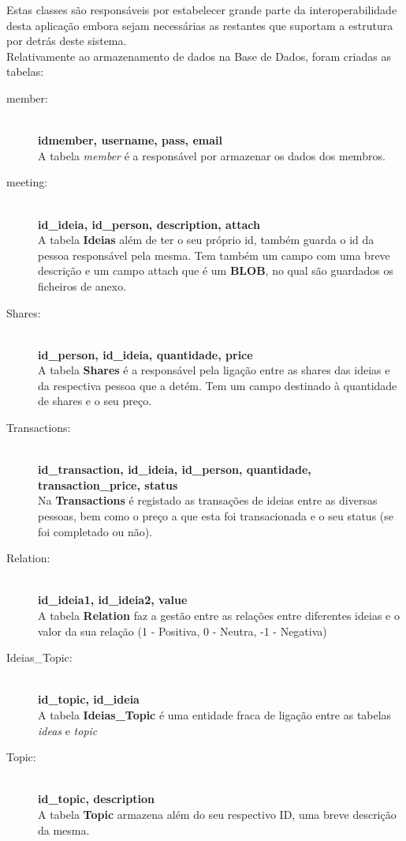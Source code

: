 \documentclass[12pt]{article} %
\begin{document}
Estas classes são responsáveis por estabelecer grande parte da interoperabilidade desta aplicação embora sejam necessárias as restantes que suportam a estrutura por detrás deste sistema.\\ 




Relativamente ao armazenamento de dados na Base de Dados, foram criadas as tabelas:
\begin{description}
	\item[member:] \hfill \\
	\textbf{idmember, username, pass, email}\\
	A tabela \emph{member} é a responsável por armazenar os dados dos membros.	
	\item[meeting:] \hfill \\
	\textbf{id\_ideia, id\_person, description, attach}\\
	A tabela \textbf{Ideias} além de ter o seu próprio id, também guarda o id da pessoa responsável pela mesma. Tem também um campo com uma breve descrição e um campo attach que é um \textbf{BLOB}, no qual são guardados os ficheiros de anexo.
	\item[Shares:] \hfill \\
	\textbf{id\_person, id\_ideia, quantidade, price}\\
	A tabela \textbf{Shares} é a responsável pela ligação entre as shares das ideias e da respectiva pessoa que a detém. Tem um campo destinado à quantidade de shares e o seu preço.
	\item[Transactions:] \hfill \\
	\textbf{id\_transaction, id\_ideia, id\_person,	quantidade, transaction\_price, status}\\
	Na \textbf{Transactions} é registado as transações de ideias entre as diversas pessoas, bem como o preço a que esta foi transacionada e o seu status (se foi completado ou não).
	\item[Relation:] \hfill \\
	\textbf{id\_ideia1, id\_ideia2, value}\\
	A tabela \textbf{Relation} faz a gestão entre as relações entre diferentes ideias e o valor da sua relação (1 - Positiva, 0 - Neutra, -1 - Negativa)
	\item[Ideias\_Topic:] \hfill \\
	\textbf{id\_topic, id\_ideia}\\
	A tabela \textbf{Ideias\_Topic} é uma entidade fraca de ligação entre as tabelas \emph{ideas} e \emph{topic}
	\item[Topic:] \hfill \\
	\textbf{id\_topic, description}\\
	A tabela \textbf{Topic} armazena além do seu respectivo ID, uma breve descrição da mesma.
\end{description}
\end{document}
